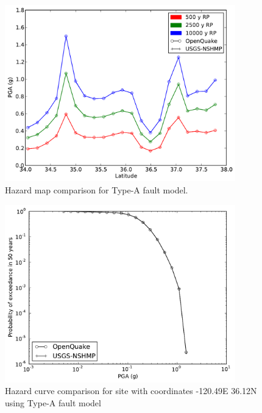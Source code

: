 \begin{figure}
\centering
\includegraphics[width=10cm]{./qareport/pictures/oq_nshmp_aFault.pdf}
\caption{Hazard map comparison for Type-A fault model.}
\label{fig:type_a_map}
\end{figure}
\begin{figure}
\centering
\includegraphics[width=10cm]{./qareport/pictures/-120pt49_36pt12_aFault.pdf}
\caption{Hazard curve comparison for site with coordinates -120.49E 36.12N using Type-A fault model}
\label{fig:type_a_curve}
\end{figure}

